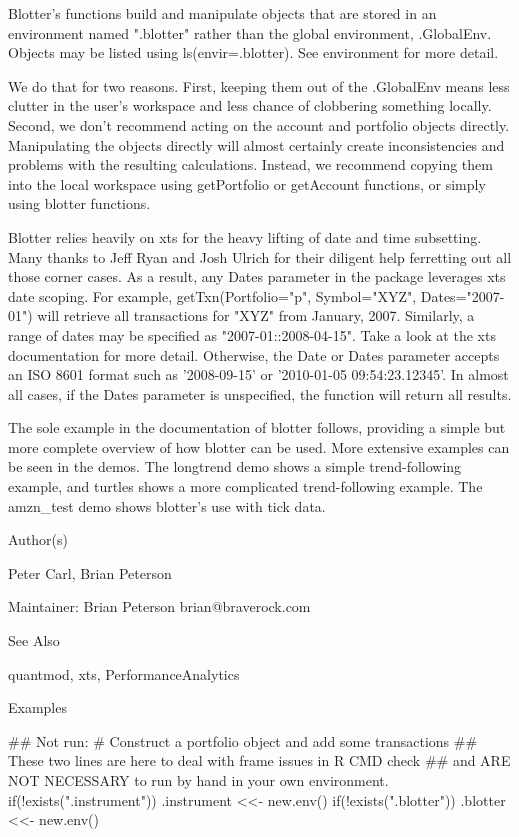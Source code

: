 Blotter's functions build and manipulate objects that are stored in an environment named ".blotter" rather than the global environment, .GlobalEnv. Objects may be listed using ls(envir=.blotter). See environment for more detail.

We do that for two reasons. First, keeping them out of the .GlobalEnv means less clutter in the user's workspace and less chance of clobbering something locally. Second, we don't recommend acting on the account and portfolio objects directly. Manipulating the objects directly will almost certainly create inconsistencies and problems with the resulting calculations. Instead, we recommend copying them into the local workspace using getPortfolio or getAccount functions, or simply using blotter functions.

Blotter relies heavily on xts for the heavy lifting of date and time subsetting. Many thanks to Jeff Ryan and Josh Ulrich for their diligent help ferretting out all those corner cases. As a result, any Dates parameter in the package leverages xts date scoping. For example, getTxn(Portfolio="p", Symbol="XYZ", Dates="2007-01") will retrieve all transactions for "XYZ" from January, 2007. Similarly, a range of dates may be specified as "2007-01::2008-04-15". Take a look at the xts documentation for more detail. Otherwise, the Date or Dates parameter accepts an ISO 8601 format such as '2008-09-15' or '2010-01-05 09:54:23.12345'. In almost all cases, if the Dates parameter is unspecified, the function will return all results.

The sole example in the documentation of blotter follows, providing a simple but more complete overview of how blotter can be used. More extensive examples can be seen in the demos. The longtrend demo shows a simple trend-following example, and turtles shows a more complicated trend-following example. The amzn_test demo shows blotter's use with tick data.

Author(s)

Peter Carl, Brian Peterson

Maintainer: Brian Peterson brian@braverock.com

See Also

quantmod, xts, PerformanceAnalytics

Examples

## Not run: 
# Construct a portfolio object and add some transactions
## These two lines are here to deal with frame issues in R CMD check
## and ARE NOT NECESSARY to run by hand in your own environment.
if(!exists(".instrument")) .instrument <<- new.env()
if(!exists(".blotter")) .blotter <<- new.env()

